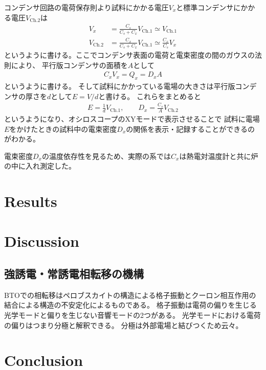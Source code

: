 \documentclass[11pt,dvipdfmx,a4paper]{jsarticle}
\begin{document}
コンデンサ回路の電荷保存則より試料にかかる電圧\(V_x\)と標準コンデンサにかかる電圧\(V_{\text{Ch.2}}\)は
\begin{align}
    V_x &= \frac{C_s}{C_s+C_x}V_{\text{Ch.1}} \simeq V_{\text{Ch.1}}\\
    V_{\text{Ch.2}} &= \frac{C_x}{C_s+C_x}V_{\text{Ch.1}} \simeq \frac{C_x}{C_s}V_x
\end{align}
というように書ける。ここでコンデンサ表面の電荷と電束密度の間のガウスの法則により、
平行版コンデンサの面積を\(A\)として
\begin{align}
    C_x V_x = Q_x = D_x A
\end{align}
というように書ける。
そして試料にかかっている電場の大きさは平行版コンデンサの厚さを\(d\)として\(E = V/d\)と書ける。
これらをまとめると
\begin{align}
    E = \frac{1}{d}V_{\text{Ch.1}}, \qquad
    D_x = \frac{C_s}{A}V_{\text{Ch.2}}
\end{align}
というようになり、オシロスコープのXYモードで表示させることで
試料に電場\(E\)をかけたときの試料中の電束密度\(D_x\)の関係を表示・記録することができるのがわかる。

電束密度\(D_x\)の温度依存性を見るため、実際の系では\(C_x\)は熱電対温度計と共に炉の中に入れ測定した。


\section{Results}

\section{Discussion}
\subsection{強誘電・常誘電相転移の機構}
BTOでの相転移はペロブスカイトの構造による格子振動とクーロン相互作用の結合による構造の不安定化によるものである。
格子振動は電荷の偏りを生じる光学モードと偏りを生じない音響モードの2つがある。
光学モードにおける電荷の偏りはつまり分極と解釈できる。
分極は外部電場と結びつくため云々。

\section{Conclusion}




\nocite{*}

\end{document}

